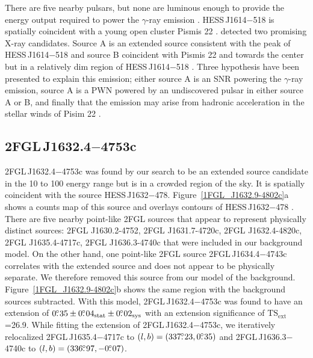\documentclass[12pt,preprint]{aastex}
\newcommand{\gev}{\text{GeV}\xspace}
\newcommand{\tev}{\text{TeV}\xspace}
\newcommand{\tsext}{{\ensuremath{\text{TS}_{\text{ext}}}}\xspace}
\newcommand{\suzaku}{\text{{\em Suzaku}}\xspace}
\newcommand{\sys}{\text{sys}\xspace}
\newcommand{\stat}{\text{stat}\xspace}
\begin{document}
There are five nearby pulsars, but none are luminous enough to
provide the energy output required to power the $\gamma$-ray
emission \citep{closer_look_hess_j1614-518}.  HESS\,J1614$-$518
is spatially coincident with a young open cluster Pismis 22
\citep{hess_1614_landi_atel,closer_look_hess_j1614-518}.  \suzaku detected
two promising X-ray candidates. Source A is an extended source consistent
with the peak of HESS\,J1614$-$518 and source B coincident with Pismis 22
and towards the center but in a relatively dim region of HESS\,J1614$-$518
\citep{suazku_hess_j1614_518}.  Three hypothesis have been presented to
explain this emission; either source A is an SNR powering the $\gamma$-ray
emission, source A is a PWN powered by an undiscovered pulsar in either
source A or B, and finally that the emission may arise from hadronic
acceleration in the stellar winds of Pisim 22 \citep{cangaroo_j1614-518}.

\subsection{2FGL\,J1632.4$-$4753c}
\label{section_2FGL_J1632.4-4753c}




2FGL\,J1632.4$-$4753c was found by our search to be an extended source
candidate in the 10 \gev to 100 \gev energy range but is in a crowded
region of the sky.  It is spatially coincident with the \tev source
HESS\,J1632$-$478.  Figure~\ref{1FGL_J1632.9-4802c}a shows a counts
map of this source and overlays \tev contours of HESS\,J1632$-$478
\citep{hess_plane_survey}.  There are five nearby point-like 2FGL
sources that appear to  represent physically distinct sources: 2FGL
J1630.2-4752, 2FGL J1631.7-4720c, 2FGL J1632.4-4820c, 2FGL J1635.4-4717c,
2FGL J1636.3-4740c that were included in our background model.  On the
other hand, one point-like 2FGL source 2FGL\,J1634.4$-$4743c  correlates
with the extended \tev source and does not appear to be physically
separate.  We therefore removed this source from our model of the
background.  Figure~\ref{1FGL_J1632.9-4802c}b shows the same region with
the background sources subtracted.  With this model, 2FGL\,J1632.4$-$4753c
was found to have an extension of $0\fdg35\pm0\fdg04_\stat\pm0\fdg02_\sys$
with an extension significance of \tsext=26.9.  While fitting the
extension of 2FGL\,J1632.4$-$4753c, we iteratively relocalized
2FGL\,J1635.4$-$4717c to $(l,b)=(337\mbox{$.\!\!^\circ$}23,0\mbox{$.\!\!^\circ$}35)$ and
2FGL\,J1636.3$-$4740c to $(l,b)=(336\mbox{$.\!\!^\circ$}97,-0\mbox{$.\!\!^\circ$}07)$.
\end{document}
